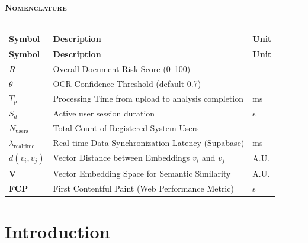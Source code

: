 \documentclass[12pt,a4paper,oneside]{report}
\newcommand{\chaptertitle}[1]{%
  \begin{center}
    \textsc{\Large\textbf{#1}}\\[2pt]
    \rule{0.5\textwidth}{0.5pt}
  \end{center}
}
\begin{document}
\newpage
\chaptertitle{Nomenclature}

\begin{longtable}{|>{\bfseries}p{3cm}|p{8.5cm}|p{1.5cm}|}
\hline
\textbf{Symbol} & \textbf{Description} & \textbf{Unit} \\
\hline
\endfirsthead
\hline
\textbf{Symbol} & \textbf{Description} & \textbf{Unit} \\
\hline
\endhead
$R$ & Overall Document Risk Score (0--100) & -- \\ \hline
$\theta$ & OCR Confidence Threshold (default 0.7) & -- \\ \hline
$T_p$ & Processing Time from upload to analysis completion & ms \\ \hline
$S_d$ & Active user session duration & s \\ \hline
$N_{\text{users}}$ & Total Count of Registered System Users & -- \\ \hline
$\lambda_{\text{realtime}}$ & Real-time Data Synchronization Latency (Supabase) & ms \\ \hline
$d(v_i, v_j)$ & Vector Distance between Embeddings $v_i$ and $v_j$ & A.U. \\ \hline
$\mathbf{V}$ & Vector Embedding Space for Semantic Similarity & A.U. \\ \hline
FCP & First Contentful Paint (Web Performance Metric) & s \\ \hline
\end{longtable}

\newpage
\listoffigures
{}

\newpage
\listoftables
{}

\newpage
{}

\chapter{Introduction}
\end{document}
